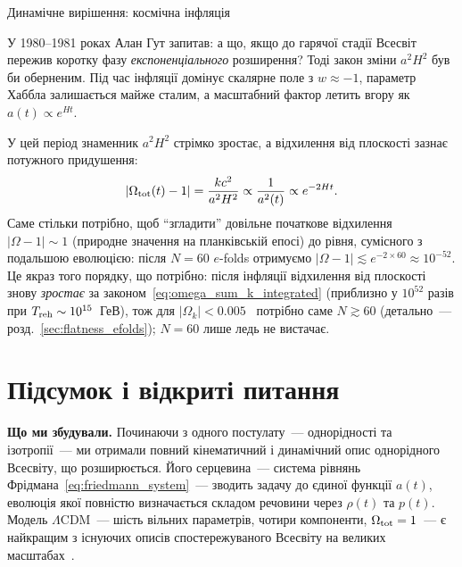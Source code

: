 \begin{keybox}{Динамічне вирішення: космічна інфляція~\cite{guth_1981,linde_1982,albrecht_1982}}

У 1980--1981 роках Алан Гут запитав: а що, якщо до гарячої стадії
Всесвіт пережив коротку фазу \emph{експоненціального} розширення?
Тоді закон зміни $a^2H^2$ був би оберненим.
Під час інфляції домінує скалярне поле з $w \approx -1$,
параметр Хаббла залишається майже сталим,
а масштабний фактор летить вгору як $a(t) \propto e^{Ht}$.

У цей період знаменник $a^2H^2$ стрімко зростає, а відхилення від плоскості зазнає потужного придушення:
\begin{equation}
  |\Omega_{\rm tot}(t) - 1| = \frac{kc^2}{a^2 H^2} \propto \frac{1}{a^2(t)} \propto e^{-2Ht}.
\end{equation}
Саме стільки потрібно, щоб \enquote{згладити} довільне початкове відхилення
$|\Omega-1| \sim 1$ (природне значення на планківській епосі) до рівня,
сумісного з подальшою еволюцією: після $N = 60$ $e$-folds отримуємо
$|\Omega-1| \lesssim e^{-2 \times 60} \approx 10^{-52}$.
Це якраз того порядку, що потрібно: після інфляції відхилення від плоскості
знову \emph{зростає} за законом~\eqref{eq:omega_sum_k_integrated}
(приблизно у $10^{52}$ разів при $T_{\rm reh}\sim10^{15}$~ГеВ), тож для
$|\Omega_k| < 0.005$~\cite{planck_2018} потрібно саме $N \gtrsim 60$
(детально~--- розд.~\ref{sec:flatness_efolds}); $N=60$ лише ледь не вистачає.
\end{keybox}


\section*{Підсумок і відкриті питання}

\textbf{Що ми збудували.}
Починаючи з одного постулату~--- однорідності та ізотропії~--- ми отримали
повний кінематичний і динамічний опис однорідного Всесвіту, що розширюється.
Його серцевина~--- система рівнянь Фрідмана~\eqref{eq:friedmann_system}~---
зводить задачу до єдиної функції $a(t)$, еволюція якої повністю визначається
складом речовини через $\rho(t)$ та $p(t)$.
Модель $\Lambda$CDM~--- шість вільних параметрів, чотири компоненти,
$\Omega_{\rm tot} = 1$~--- є найкращим з існуючих описів спостережуваного
Всесвіту на великих масштабах~\cite{planck_2018}.

